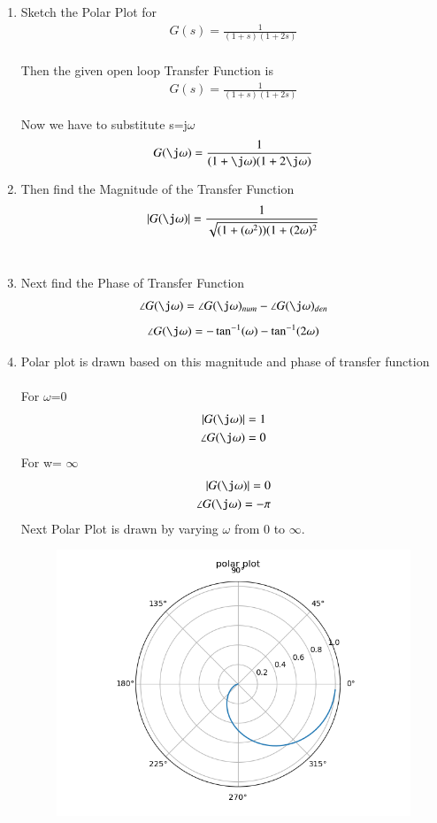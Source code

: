 \begin{enumerate}[label=\thesection.\arabic*.,ref=\thesection.\theenumi]
\item
Sketch the Polar Plot for
\begin{align}
G(s) = \frac{1}{(1+s)(1+2s)}
\end{align}
\\
\solution  Then the given open loop Transfer Function is
\begin{align}
G(s) = \frac{1}{(1+s)(1+2s)}
\end{align}

Now we have to substitute s=j$\omega$\\
\begin{align}
G(\j\omega) = \frac{1}{(1+\j\omega)(1+2\j\omega)} 
\end{align}
\item
Then find the Magnitude of the Transfer Function
\\
\solution
\begin{multline}
      |G(\j\omega)| = \frac{1}{\sqrt{(1+(\omega^2))(1+(2\omega)^2}}
\end{multline}\\
\item
Next find the Phase of Transfer Function\\
\solution
\begin{align}
    \angle G(\j\omega) = \angle G(\j\omega)_{num} - \angle G(\j\omega)_{den}
\end{align}
\begin{multline}
    \angle G(\j\omega) = -\tan^{-1}(\omega)-\tan^{-1}(2\omega)
\end{multline}
\item
Polar plot is drawn based on this magnitude and phase of transfer function\\
\solution\\
For $\omega$=0 
\begin{align}
    |G(\j\omega)| = 1\\
    \angle G(\j\omega) = 0
\end{align}
For w= $\infty$
\begin{align}
    |G(\j\omega)| = 0\\
    \angle G(\j\omega) = -\pi
\end{align}
Next Polar Plot is drawn by varying $\omega$ from 0 to $\infty$.\\
\begin{figure}
    \centering
    \includegraphics[width=0.7\linewidth]{ee18btech11012_1.png}

\end{figure}
\end{enumerate}

